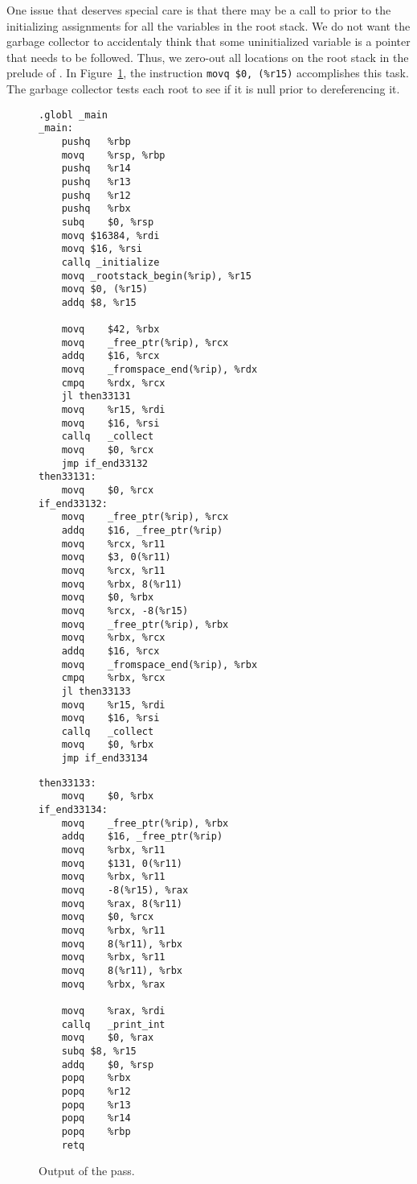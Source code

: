 \documentclass[11pt]{book}
\begin{document}
One issue that deserves special care is that there may be a call to
 prior to the initializing assignments for all the
variables in the root stack. We do not want the garbage collector to
accidentaly think that some uninitialized variable is a pointer that
needs to be followed. Thus, we zero-out all locations on the root
stack in the prelude of . In
Figure~\ref{fig:print-x86-output-gc}, the instruction
%
\lstinline{movq $0, (%r15)}
%
accomplishes this task. The garbage collector tests each root to see
if it is null prior to dereferencing it.

\begin{figure}[htbp]
\begin{minipage}[t]{0.5\textwidth}
\begin{lstlisting}[basicstyle=\ttfamily\scriptsize]
	.globl _main
_main:
	pushq	%rbp
	movq	%rsp, %rbp
	pushq	%r14
	pushq	%r13
	pushq	%r12
	pushq	%rbx
	subq	$0, %rsp
	movq $16384, %rdi
	movq $16, %rsi
	callq _initialize
	movq _rootstack_begin(%rip), %r15
	movq $0, (%r15)
	addq $8, %r15

	movq	$42, %rbx
	movq	_free_ptr(%rip), %rcx
	addq	$16, %rcx
	movq	_fromspace_end(%rip), %rdx
	cmpq	%rdx, %rcx
	jl then33131
	movq	%r15, %rdi
	movq	$16, %rsi
	callq	_collect
	movq	$0, %rcx
	jmp if_end33132
then33131:
	movq	$0, %rcx
if_end33132:
	movq	_free_ptr(%rip), %rcx
	addq	$16, _free_ptr(%rip)
	movq	%rcx, %r11
	movq	$3, 0(%r11)
	movq	%rcx, %r11
	movq	%rbx, 8(%r11)
	movq	$0, %rbx
	movq	%rcx, -8(%r15)
	movq	_free_ptr(%rip), %rbx
	movq	%rbx, %rcx
	addq	$16, %rcx
	movq	_fromspace_end(%rip), %rbx
	cmpq	%rbx, %rcx
	jl then33133
	movq	%r15, %rdi
	movq	$16, %rsi
	callq	_collect
	movq	$0, %rbx
	jmp if_end33134
\end{lstlisting}
\end{minipage}
\begin{minipage}[t]{0.45\textwidth}
\begin{lstlisting}[basicstyle=\ttfamily\scriptsize]
then33133:
	movq	$0, %rbx
if_end33134:
	movq	_free_ptr(%rip), %rbx
	addq	$16, _free_ptr(%rip)
	movq	%rbx, %r11
	movq	$131, 0(%r11)
	movq	%rbx, %r11
	movq	-8(%r15), %rax
	movq	%rax, 8(%r11)
	movq	$0, %rcx
	movq	%rbx, %r11
	movq	8(%r11), %rbx
	movq	%rbx, %r11
	movq	8(%r11), %rbx
	movq	%rbx, %rax

	movq	%rax, %rdi
	callq	_print_int
	movq	$0, %rax
	subq $8, %r15
	addq	$0, %rsp
	popq	%rbx
	popq	%r12
	popq	%r13
	popq	%r14
	popq	%rbp
	retq
\end{lstlisting}
\end{minipage}
\caption{Output of the  pass.}
\label{fig:print-x86-output-gc}
\end{figure}
\end{document}
